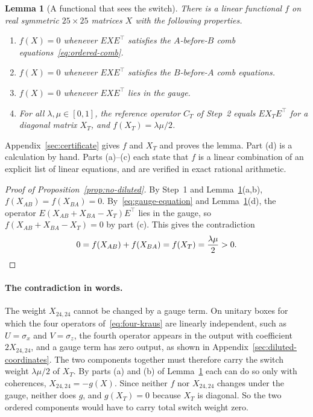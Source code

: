 \documentclass[11pt,letterpaper]{article}
\newtheorem{lemma}[theorem]{Lemma}
\theoremstyle{definition}\newtheorem{definition}[theorem]{Definition}
\begin{document}
\begin{lemma}[A functional that sees the switch]\label{lem:exact-obstruction}
There is a linear functional $f$ on real symmetric $25\times25$
matrices $X$ with the following properties.
\begin{enumerate}
\item[\textup{(a)}] $f(X)=0$ whenever $EXE^{\top}$ satisfies the
$A$-before-$B$ comb equations~\eqref{eq:ordered-comb}.
\item[\textup{(b)}] $f(X)=0$ whenever $EXE^{\top}$ satisfies the
$B$-before-$A$ comb equations.
\item[\textup{(c)}] $f(X)=0$ whenever $EXE^{\top}$ lies in the gauge.
\item[\textup{(d)}] For all $\lambda,\mu\in[0,1]$, the reference
operator $C_T$ of Step~2 equals $EX_TE^{\top}$ for a diagonal matrix
$X_T$, and $f(X_T)=\lambda\mu/2$.
\end{enumerate}
\end{lemma}

Appendix~\ref{sec:certificate} gives $f$ and $X_T$ and proves the
lemma. Part (d) is a calculation by hand. Parts (a)--(c) each state
that $f$ is a linear combination of an explicit list of linear
equations, and are verified in exact rational arithmetic.

\begin{proof}[Proof of Proposition~\ref{prop:no-diluted}]
By Step~1 and Lemma~\ref{lem:exact-obstruction}(a,b),
$f(X_{AB})=f(X_{BA})=0$. By~\eqref{eq:gauge-equation} and
Lemma~\ref{lem:exact-obstruction}(d), the operator
$E(X_{AB}+X_{BA}-X_T)E^{\top}$ lies in the gauge, so
$f(X_{AB}+X_{BA}-X_T)=0$ by part (c). This gives the contradiction
\[
 0=f(X_{AB})+f(X_{BA})=f(X_T)=\frac{\lambda\mu}2>0 . \qedhere
\]
\end{proof}

\paragraph{The contradiction in words.}
The weight $X_{24,24}$ cannot be changed by a gauge term. On unitary
boxes for which the four operators of~\eqref{eq:four-kraus} are
linearly independent, such as $U=\sigma_x$ and $V=\sigma_z$, the fourth
operator appears in the output with coefficient $2X_{24,24}$, and a
gauge term has zero output, as shown in Appendix~\ref{sec:diluted-coordinates}. The two components together must therefore
carry the switch weight $\lambda\mu/2$ of $X_T$. By parts (a) and (b)
of Lemma~\ref{lem:exact-obstruction} each can do so only with
coherences, $X_{24,24}=-g(X)$. Since neither
$f$ nor $X_{24,24}$ changes under the gauge, neither does $g$, and
$g(X_T)=0$ because $X_T$ is diagonal. So the two ordered components
would have to carry total switch weight zero.
\end{document}
